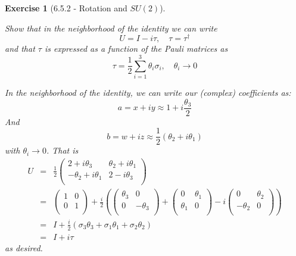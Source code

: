 \documentclass[12pt]{article}
\def\be{\begin{equation}}
\def\ee{\end{equation}}
\def\bea{\begin{eqnarray*}}
\def\eea{\end{eqnarray*}}
\def\f{\frac}
\def\l{\left}
\def\r{\right}
\newtheorem{exercise}{Exercise}
\begin{document}
\begin{exercise}[6.5.2 - Rotation and $SU(2)$]
\begin{exercises}
			\item  Show that in the neighborhood of the identity we can write
			\be
				U = I - i\tau, \quad \tau=\tau^\dagger
			\ee
			and that $\tau$ is expressed as a function of the Pauli matrices as
			\be
				\tau =  \f{1}{2} \sum_{i=1}^3 \theta_i\sigma_i, \quad \theta_i \to 0
			\ee
			\begin{multianswer}
				In the neighborhood of the identity, we can write our (complex) coefficients as:
				\be
					a = x +iy \approx 1 + i\f{\theta_3}{2}
				\ee
				And
				\be
					b = w + iz \approx \f{1}{2}\l(\theta_2 + i\theta_1\r)
				\ee
				with $\theta_i\to0$. That is
				\bea
					U &=& \f{1}{2}
					\begin{pmatrix}
						2 +i\theta_3 & \theta_2 + i\theta_1 \\
						-\theta_2 + i\theta_1 & 2-i\theta_3 \\
					\end{pmatrix} \\
					&=&
					\begin{pmatrix}
						1 & 0 \\
						0 & 1 \\
					\end{pmatrix}
					+ \f{i}{2} \l(
					\begin{pmatrix}
						\theta_3 & 0 \\
						0 & -\theta_3 \\
					\end{pmatrix}
					+
					\begin{pmatrix}
						0 & \theta_1 \\
						\theta_1 & 0 \\
					\end{pmatrix}
					-i
					\begin{pmatrix}
						0 & \theta_2 \\
						-\theta_2 & 0 \\
					\end{pmatrix}
					\r) \\
					&=& I + \f{i}{2}\l( \sigma_3\theta_3 + \sigma_1\theta_1 + \sigma_2\theta_2 \r) \\
					&=& I +i\tau 
				\eea
				as desired. 
			\end{multianswer}
			

\end{exercises}
\end{exercise}
\end{document}
